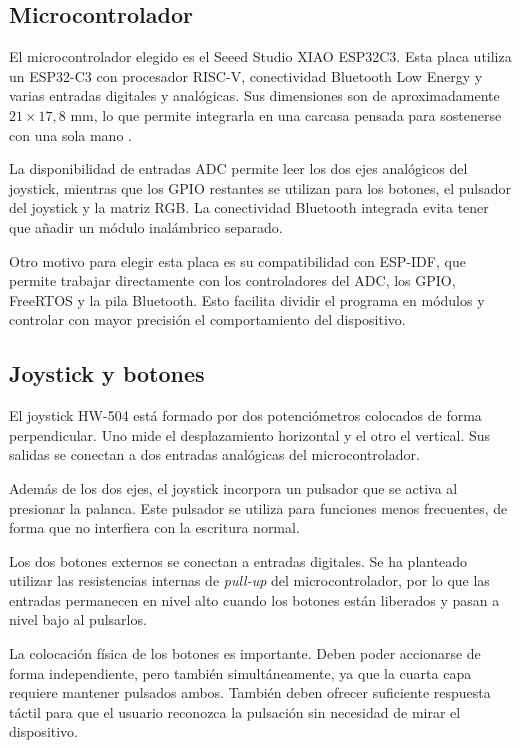 \subsection{Microcontrolador}
\label{subsec:microcontrolador}

El microcontrolador elegido es el Seeed Studio XIAO ESP32C3. Esta placa utiliza un ESP32-C3 con procesador RISC-V, conectividad Bluetooth Low Energy y varias entradas digitales y analógicas. Sus dimensiones son de aproximadamente \(21 \times 17{,}8\) mm, lo que permite integrarla en una carcasa pensada para sostenerse con una sola mano \cite{xiaoESP32C3}.

La disponibilidad de entradas ADC permite leer los dos ejes analógicos del joystick, mientras que los GPIO restantes se utilizan para los botones, el pulsador del joystick y la matriz RGB. La conectividad Bluetooth integrada evita tener que añadir un módulo inalámbrico separado.

Otro motivo para elegir esta placa es su compatibilidad con ESP-IDF, que permite trabajar directamente con los controladores del ADC, los GPIO, FreeRTOS y la pila Bluetooth. Esto facilita dividir el programa en módulos y controlar con mayor precisión el comportamiento del dispositivo.

\subsection{Joystick y botones}
\label{subsec:joystick-botones}

El joystick HW-504 está formado por dos potenciómetros colocados de forma perpendicular. Uno mide el desplazamiento horizontal y el otro el vertical. Sus salidas se conectan a dos entradas analógicas del microcontrolador.

Además de los dos ejes, el joystick incorpora un pulsador que se activa al presionar la palanca. Este pulsador se utiliza para funciones menos frecuentes, de forma que no interfiera con la escritura normal.

Los dos botones externos se conectan a entradas digitales. Se ha planteado utilizar las resistencias internas de \textit{pull-up} del microcontrolador, por lo que las entradas permanecen en nivel alto cuando los botones están liberados y pasan a nivel bajo al pulsarlos.

La colocación física de los botones es importante. Deben poder accionarse de forma independiente, pero también simultáneamente, ya que la cuarta capa requiere mantener pulsados ambos. También deben ofrecer suficiente respuesta táctil para que el usuario reconozca la pulsación sin necesidad de mirar el dispositivo.

